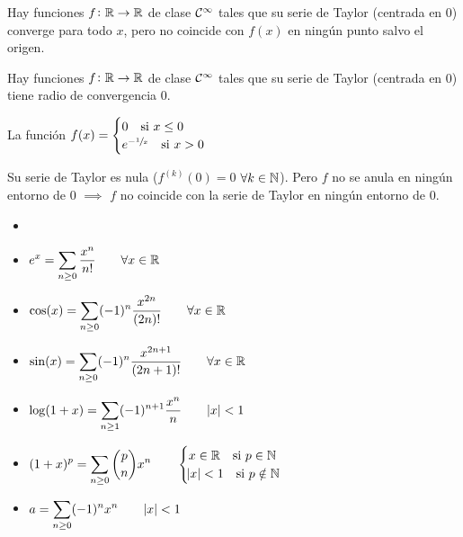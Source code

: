\begin{obs}
	Hay funciones $f \colon \mathbb{R} \to \mathbb{R}$ de clase $\mathcal{C}^\infty$ tales que su
	serie de Taylor (centrada en 0) converge para todo $x$, pero no coincide con
	$f(x)$ en ningún punto salvo el origen.

	Hay funciones $f \colon \mathbb{R} \to \mathbb{R}$ de clase $\mathcal{C}^\infty$ tales que su
	serie de Taylor (centrada en 0) tiene radio de convergencia 0.
\end{obs}

\begin{example*}
	La función $f(x) = \begin{cases} 0 \quad \text{si } x \leq 0 \\
	e^{-\sfrac{1}{x}} \quad \text{si } x > 0 \end{cases}$
	\begin{center}
    \end{center}
	Su serie de Taylor es nula ($f^{(k)}(0) = 0$ $\forall k \in \mathbb{N}$). Pero $f$ no
	se anula en ningún entorno de 0 $\implies$ $f$ no coincide con la serie de
	Taylor en ningún entorno de 0.
\end{example*}

\begin{prop}
	\begin{itemize}
		\item[]
		\item $\displaystyle e^x = \sum_{n \geq 0} \frac{x^n}{n!}
			\qquad \forall x \in \mathbb{R}$
		\item $\displaystyle \cos(x) = \sum_{n \geq 0} (-1)^{n}\frac{x^{2n}}{(2n)!}
			\qquad \forall x \in \mathbb{R}$
		\item $\displaystyle \sin(x) = \sum_{n \geq 0} (-1)^{n}\frac{x^{2n+1}}{(2n+1)!}
			\qquad \forall x \in \mathbb{R}$
		\item $\displaystyle \log(1+x) = \sum_{n \geq 1} (-1)^{n+1} \frac{x^n}{n}
			\qquad \abs{x} < 1$
		\item $\displaystyle (1+x)^p = \sum_{n \geq 0} {p \choose n} x^n \qquad
			\begin{cases} x \in \mathbb{R} \quad \text{si } p \in \mathbb{N} \\ \abs{x} < 1
			\quad \text{si } p \notin \mathbb{N} \end{cases}$
		\item $\displaystyle a = \sum_{n \geq 0} (-1)^n x^n \qquad \abs{x} < 1$
	\end{itemize}
\end{prop}


